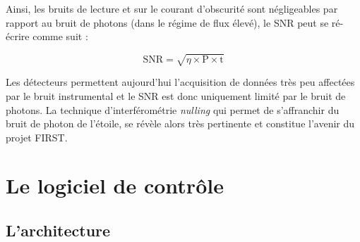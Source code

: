 
Ainsi, les bruits de lecture et sur le courant d'obscurité sont négligeables par rapport au bruit de photons (dans le régime de flux élevé), le \ac{SNR} peut se ré-écrire comme suit :

\begin{equation}
    \text{SNR} = \sqrt{\eta \times \text{P} \times \text{t}}
\end{equation}

Les détecteurs permettent aujourd'hui l'acquisition de données très peu affectées par le bruit instrumental et le \ac{SNR} est donc uniquement limité par le bruit de photons. La technique d'interférométrie \textit{nulling} qui permet de s'affranchir du bruit de photon de l'étoile, se révèle alors très pertinente et constitue l'avenir du projet \ac{FIRST}.


\section{Le logiciel de contrôle}
\label{sec:ControlSoftware}

\subsection{L'architecture}

